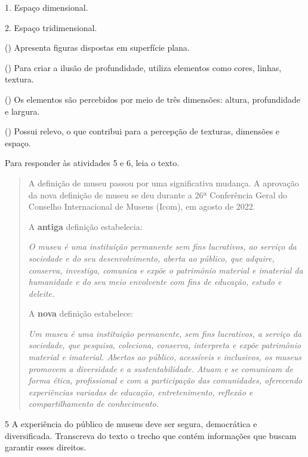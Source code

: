 \begin{multicols}{2}
1. Espaço dimensional.

2. Espaço tridimensional.

\columnbreak

() Apresenta figuras dispostas em superfície plana.

() Para criar a ilusão de profundidade, utiliza elementos como cores,
linhas, textura.

() Os elementos são percebidos por meio de três dimensões: altura,
profundidade e largura.

() Possui relevo, o que contribui para a percepção de texturas,
dimensões e espaço.
\end{multicols}


\noindent{}Para responder às atividades 5 e 6, leia o texto.

\begin{quote}
A definição de museu passou por uma significativa mudança. A aprovação
da nova definição de museu se deu durante a 26ª Conferência Geral do
Conselho Internacional de Museus (Icom), em agosto de 2022.


A \textbf{antiga} definição estabelecia:

\emph{O museu é uma instituição permanente sem fins lucrativos, ao
serviço da sociedade e do seu desenvolvimento, aberta ao público, que
adquire, conserva, investiga, comunica e expõe o patrimônio material e
imaterial da humanidade e do seu meio envolvente com fins de educação,
estudo e deleite.}


A \textbf{nova} definição estabelece:

\emph{Um museu é uma instituição permanente, sem fins lucrativos, a
serviço da sociedade, que pesquisa, coleciona, conserva, interpreta e
expõe patrimônio material e imaterial. Abertos ao público, acessíveis e
inclusivos, os museus promovem a diversidade e a sustentabilidade. Atuam
e se comunicam de forma ética, profissional e com a participação das
comunidades, oferecendo experiências variadas de educação,
entretenimento, reflexão e compartilhamento de conhecimento.}

\end{quote}

\num{5}  A experiência do público de museus deve ser segura, democrática e
  diversificada. Transcreva do texto o trecho que contém informações que
  buscam garantir esses direitos.

